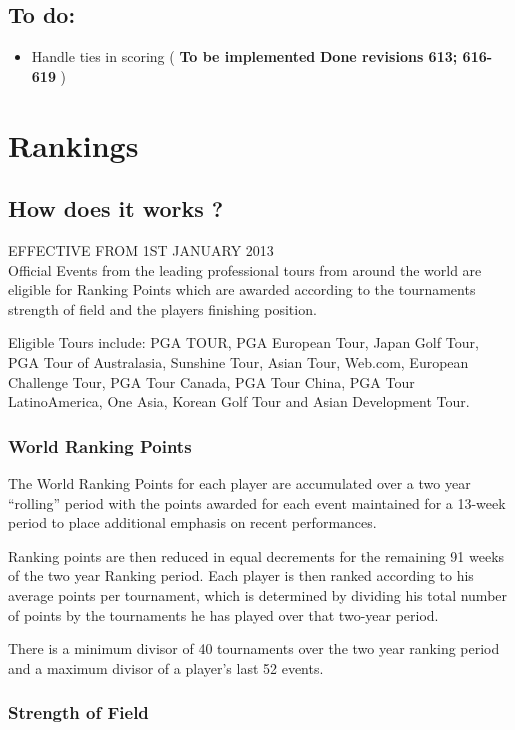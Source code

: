 \documentclass{article}
\begin{document}
\subsection{To do:}
\begin{itemize}
	\item Handle ties in scoring (\textbf{\color{orange} To be implemented} \textbf{Done revisions 613; 616-619} )
\end{itemize}

\clearpage

\section{Rankings}
\subsection{How does it works ?}
EFFECTIVE FROM 1ST JANUARY 2013\\
Official Events from the leading professional tours from around the world are eligible for Ranking Points which are awarded according to the tournaments strength of field and the players finishing position.

Eligible Tours include: PGA TOUR, PGA European Tour, Japan Golf Tour, PGA Tour of Australasia, Sunshine Tour, Asian Tour, Web.com, European Challenge Tour, PGA Tour Canada, PGA Tour China, PGA Tour LatinoAmerica, One Asia, Korean Golf Tour and Asian Development Tour.

\subsubsection{World Ranking Points}

The World Ranking Points for each player are accumulated over a two year “rolling” period with the points awarded for each event maintained for a 13-week period to place additional emphasis on recent performances.

Ranking points are then reduced in equal decrements for the remaining 91 weeks of the two year Ranking period. Each player is then ranked according to his average points per tournament, which is determined by dividing his total number of points by the tournaments he has played over that two-year period.

There is a minimum divisor of 40 tournaments over the two year ranking period and a maximum divisor of a player’s last 52 events.

\subsubsection{Strength of Field}
\end{document}
